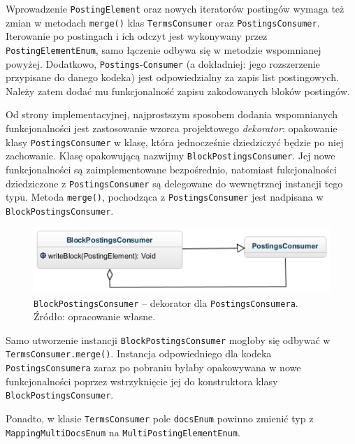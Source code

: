 \begin{enumerate}
\end{enumerate}

Wprowadzenie \texttt{PostingElement} oraz nowych iteratorów postingów wymaga też zmian w metodach \texttt{merge()} klas \texttt{TermsConsumer} oraz \texttt{PostingsConsumer}. Iterowanie po postingach i ich odczyt jest wykonywany przez \texttt{PostingElementEnum}, samo łączenie odbywa się w metodzie wspomnianej powyżej. Dodatkowo, \texttt{Postings}-\texttt{Consumer} (a dokładniej: jego rozszerzenie przypisane do danego kodeka) jest odpowiedzialny za zapis list postingowych. Należy zatem dodać mu funkcjonalność zapisu zakodowanych bloków postingów. 

Od strony implementacyjnej, najprostszym sposobem dodania wspomnianych funkcjonalności jest zastosowanie wzorca projektowego \emph{dekorator}: opakowanie klasy \texttt{PostingsConsumer} w klasę, która jednocześnie dziedziczyć będzie po niej zachowanie. Klasę opakowującą nazwijmy \texttt{BlockPostingsConsumer}. Jej nowe funkcjonalności są zaimplementowane bezpośrednio, natomiast fukcjonalności dziedziczone z \texttt{PostingsConsumer} są delegowane do wewnętrznej instancji tego typu. Metoda \texttt{merge()}, pochodząca z \texttt{PostingsConsumer} jest nadpisana w \texttt{BlockPostingsConsumer}.

\begin{figure}[here]
 \centering
 \includegraphics[scale=0.8]{pictures/PostingsConsumerWrapper.jpg}
 \caption{\texttt{BlockPostingsConsumer} -- dekorator dla \texttt{PostingsConsumera}. Źródło: opracowanie własne. \label{fig:postingsConsumerWrapper}}
\end{figure}

Samo utworzenie instancji \texttt{BlockPostingsConsumer} mogłoby się odbywać w \texttt{TermsConsumer.merge()}. Instancja odpowiedniego dla kodeka \texttt{PostingsConsumera} zaraz po pobraniu byłaby opakowywana w nowe funkcjonalności poprzez wstrzyknięcie jej do konstruktora klasy \texttt{BlockPostingsConsumer}.

Ponadto, w klasie \texttt{TermsConsumer} pole \texttt{docsEnum} powinno zmienić typ z \texttt{MappingMultiDocsEnum} na \texttt{MultiPostingElementEnum}.

